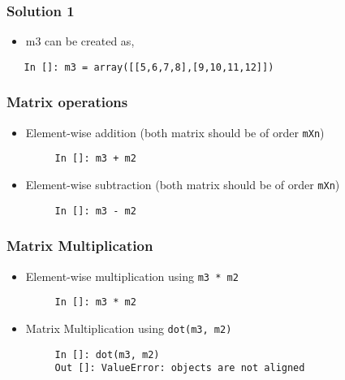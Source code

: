 \documentclass[presentation]{beamer}
\begin{document}
\begin{frame}[fragile]
\frametitle{Solution 1}
\label{sec-4}

\begin{itemize}
\item m3 can be created as,
\end{itemize}

\begin{verbatim}
   In []: m3 = array([[5,6,7,8],[9,10,11,12]])
\end{verbatim}
\end{frame}
\begin{frame}[fragile]
\frametitle{Matrix operations}
\label{sec-5}

\begin{itemize}
\item Element-wise addition (both matrix should be of order \texttt{mXn})
\begin{verbatim}
     In []: m3 + m2
\end{verbatim}

\item Element-wise subtraction (both matrix should be of order \texttt{mXn})
\begin{verbatim}
     In []: m3 - m2
\end{verbatim}

\end{itemize}
\end{frame}
\begin{frame}[fragile]
\frametitle{Matrix Multiplication}
\label{sec-6}

\begin{itemize}
\item Element-wise multiplication using \texttt{m3 * m2}
\begin{verbatim}
     In []: m3 * m2
\end{verbatim}

\item Matrix Multiplication using \texttt{dot(m3, m2)}
\begin{verbatim}
     In []: dot(m3, m2)
     Out []: ValueError: objects are not aligned
\end{verbatim}

\end{itemize}
\end{frame}
\end{document}

